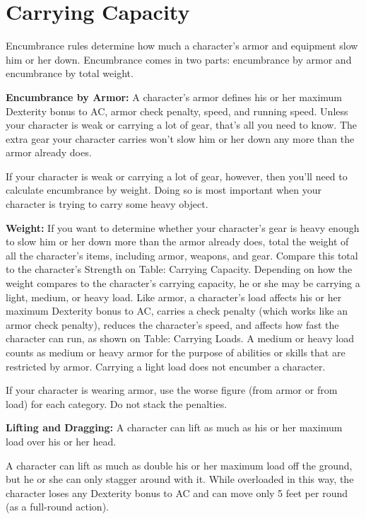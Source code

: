 \section{Carrying Capacity}

Encumbrance rules determine how much a character's armor and equipment slow him or her down. Encumbrance comes in two parts: encumbrance by armor and encumbrance by total weight.

\textbf{Encumbrance by Armor:} A character's armor defines his or her maximum Dexterity bonus to AC, armor check penalty, speed, and running speed. Unless your character is weak or carrying a lot of gear, that's all you need to know. The extra gear your character carries won't slow him or her down any more than the armor already does.

If your character is weak or carrying a lot of gear, however, then you'll need to calculate encumbrance by weight. Doing so is most important when your character is trying to carry some heavy object.

\textbf{Weight:} If you want to determine whether your character's gear is heavy enough to slow him or her down more than the armor already does, total the weight of all the character's items, including armor, weapons, and gear. Compare this total to the character's Strength on Table: Carrying Capacity. Depending on how the weight compares to the character's carrying capacity, he or she may be carrying a light, medium, or heavy load. Like armor, a character's load affects his or her maximum Dexterity bonus to AC, carries a check penalty (which works like an armor check penalty), reduces the character's speed, and affects how fast the character can run, as shown on Table: Carrying Loads. A medium or heavy load counts as medium or heavy armor for the purpose of abilities or skills that are restricted by armor. Carrying a light load does not encumber a character.

If your character is wearing armor, use the worse figure (from armor or from load) for each category. Do not stack the penalties.

\textbf{Lifting and Dragging:} A character can lift as much as his or her maximum load over his or her head.

A character can lift as much as double his or her maximum load off the ground, but he or she can only stagger around with it. While overloaded in this way, the character loses any Dexterity bonus to AC and can move only 5 feet per round (as a full-round action).

